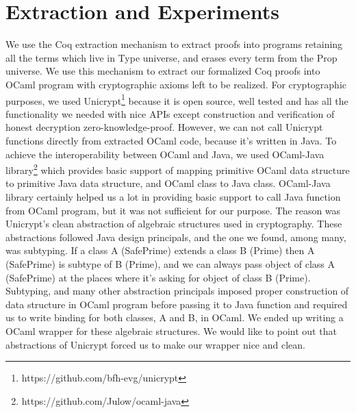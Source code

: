 \documentclass{llncs}
\begin{document}
\section{Extraction and Experiments}

We use the Coq extraction mechanism\cite{Letouzey:2003:NEC}  to extract
proofs into programs retaining all the terms which live in Type universe, 
and erases every term  from the Prop universe. We use this mechanism to 
extract our formalized Coq proofs into OCaml\cite{Leroy:2013:ORM} program 
with cryptographic axioms left to be realized. For cryptographic purposes, 
we used Unicrypt\footnote{https://github.com/bfh-evg/unicrypt}
because it is open source, well tested and has all the functionality 
we needed with nice APIs except construction and verification of 
honest decryption zero-knowledge-proof.
However, we can not call Unicrypt functions directly from extracted OCaml 
code, because it's written in Java. To achieve the interoperability 
between OCaml and Java, we used OCaml-Java library\footnote{ 
https://github.com/Julow/ocaml-java} which provides
 basic support of mapping  primitive OCaml data structure to
 primitive Java  data structure, and OCaml class to Java class. 
 OCaml-Java library certainly helped us a lot in providing basic 
 support to call Java function from OCaml program, but it was not 
 sufficient for
 our purpose. The reason was Unicrypt's clean abstraction of 
 algebraic structures used in cryptography. These abstractions followed 
 Java design principals, and the one we found, among many, was subtyping.
 If a class A (SafePrime) extends a class B (Prime) then 
 A (SafePrime) is subtype of B (Prime), 
 and we can always pass object of class A (SafePrime) at 
 the places where it's asking for object of class B (Prime). 
 Subtyping, and many other abstraction principals imposed 
 proper construction of data structure in OCaml program 
 before passing it to Java function and  
 required us to
 write binding for both classes, A and B, in OCaml. We ended up writing a
 OCaml wrapper for these algebraic structures. We would like to point out
 that abstractions of Unicrypt forced us to make our wrapper 
 nice and clean.
 
\end{document}
